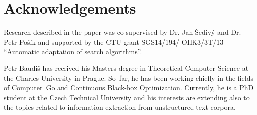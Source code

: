 \documentclass{poster15}
\begin{document}
\section*{Acknowledgements}
Research described in the paper was co-supervised by Dr. Jan Šedivý and Dr. Petr Pošík %
and supported by the CTU grant SGS14/194/ OHK3/3T/13 ``Automatic adaptation of search algorithms''.








\begin{authorcv}{Petr Baudiš}
	has received his Masters degree in
	Theoretical Computer Science at the Charles University in Prague.
	So~far, he has been working chiefly in the fields of Computer~Go
	and Continuous Black-box Optimization.
	Currently, he is a PhD student at the Czech Technical University
	and his interests are extending also to the topics related to
	information extraction from unstructured text corpora.
\end{authorcv}
\end{document}

